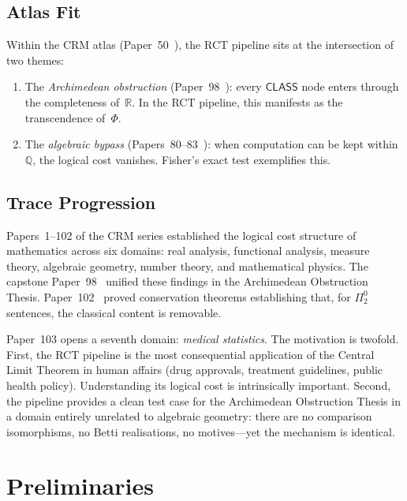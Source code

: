 \documentclass[11pt,a4paper]{article}
\theoremstyle{plain}
\theoremstyle{definition}
\newcommand{\CLASS}{\textsf{CLASS}}
\newcommand{\Q}{\mathbb{Q}}
\newcommand{\R}{\mathbb{R}}
\renewcommand{\Phi}{\varPhi}
\begin{document}
\subsection{Atlas Fit}

Within the CRM atlas (Paper~50~\cite{lee-crm-p50}), the RCT pipeline sits at the intersection of two themes:
\begin{enumerate}[nosep]
\item The \emph{Archimedean obstruction} (Paper~98~\cite{lee-crm-p98}): every $\CLASS$ node enters through the completeness of~$\R$.  In the RCT pipeline, this manifests as the transcendence of~$\Phi$.
\item The \emph{algebraic bypass} (Papers~80--83~\cite{lee-crm-p80}): when computation can be kept within~$\Q$, the logical cost vanishes.  Fisher's exact test exemplifies this.
\end{enumerate}


\subsection{Trace Progression}

Papers~1--102 of the CRM series established the logical cost structure of mathematics across six domains: real analysis, functional analysis, measure theory, algebraic geometry, number theory, and mathematical physics.  The capstone Paper~98~\cite{lee-crm-p98} unified these findings in the Archimedean Obstruction Thesis.  Paper~102~\cite{lee-crm-p102} proved conservation theorems establishing that, for $\Pi^0_2$ sentences, the classical content is removable.

Paper~103 opens a seventh domain: \emph{medical statistics}.  The motivation is twofold.  First, the RCT pipeline is the most consequential application of the Central Limit Theorem in human affairs (drug approvals, treatment guidelines, public health policy).  Understanding its logical cost is intrinsically important.  Second, the pipeline provides a clean test case for the Archimedean Obstruction Thesis in a domain entirely unrelated to algebraic geometry: there are no comparison isomorphisms, no Betti realisations, no motives---yet the mechanism is identical.

\section{Preliminaries}\label{sec:prelim}
\end{document}

